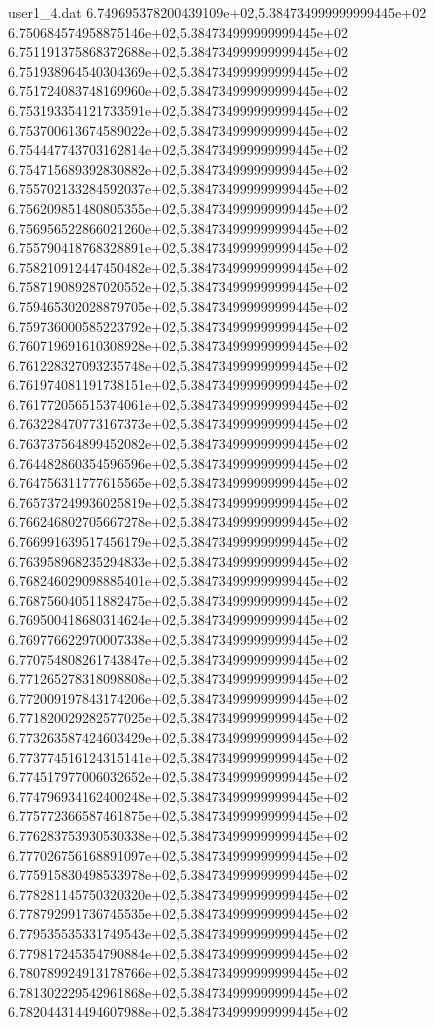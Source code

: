 \begin{filecontents}{user1_4.dat}
6.749695378200439109e+02,5.384734999999999445e+02
6.750684574958875146e+02,5.384734999999999445e+02
6.751191375868372688e+02,5.384734999999999445e+02
6.751938964540304369e+02,5.384734999999999445e+02
6.751724083748169960e+02,5.384734999999999445e+02
6.753193354121733591e+02,5.384734999999999445e+02
6.753700613674589022e+02,5.384734999999999445e+02
6.754447743703162814e+02,5.384734999999999445e+02
6.754715689392830882e+02,5.384734999999999445e+02
6.755702133284592037e+02,5.384734999999999445e+02
6.756209851480805355e+02,5.384734999999999445e+02
6.756956522866021260e+02,5.384734999999999445e+02
6.755790418768328891e+02,5.384734999999999445e+02
6.758210912447450482e+02,5.384734999999999445e+02
6.758719089287020552e+02,5.384734999999999445e+02
6.759465302028879705e+02,5.384734999999999445e+02
6.759736000585223792e+02,5.384734999999999445e+02
6.760719691610308928e+02,5.384734999999999445e+02
6.761228327093235748e+02,5.384734999999999445e+02
6.761974081191738151e+02,5.384734999999999445e+02
6.761772056515374061e+02,5.384734999999999445e+02
6.763228470773167373e+02,5.384734999999999445e+02
6.763737564899452082e+02,5.384734999999999445e+02
6.764482860354596596e+02,5.384734999999999445e+02
6.764756311777615565e+02,5.384734999999999445e+02
6.765737249936025819e+02,5.384734999999999445e+02
6.766246802705667278e+02,5.384734999999999445e+02
6.766991639517456179e+02,5.384734999999999445e+02
6.763958968235294833e+02,5.384734999999999445e+02
6.768246029098885401e+02,5.384734999999999445e+02
6.768756040511882475e+02,5.384734999999999445e+02
6.769500418680314624e+02,5.384734999999999445e+02
6.769776622970007338e+02,5.384734999999999445e+02
6.770754808261743847e+02,5.384734999999999445e+02
6.771265278318098808e+02,5.384734999999999445e+02
6.772009197843174206e+02,5.384734999999999445e+02
6.771820029282577025e+02,5.384734999999999445e+02
6.773263587424603429e+02,5.384734999999999445e+02
6.773774516124315141e+02,5.384734999999999445e+02
6.774517977006032652e+02,5.384734999999999445e+02
6.774796934162400248e+02,5.384734999999999445e+02
6.775772366587461875e+02,5.384734999999999445e+02
6.776283753930530338e+02,5.384734999999999445e+02
6.777026756168891097e+02,5.384734999999999445e+02
6.775915830498533978e+02,5.384734999999999445e+02
6.778281145750320320e+02,5.384734999999999445e+02
6.778792991736745535e+02,5.384734999999999445e+02
6.779535535331749543e+02,5.384734999999999445e+02
6.779817245354790884e+02,5.384734999999999445e+02
6.780789924913178766e+02,5.384734999999999445e+02
6.781302229542961868e+02,5.384734999999999445e+02
6.782044314494607988e+02,5.384734999999999445e+02

\end{filecontents}
